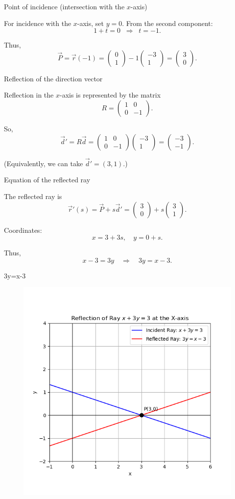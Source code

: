 \documentclass[journal]{IEEEtran}
\begin{document}
 Point of incidence (intersection with the $x$-axis)


For incidence with the $x$-axis, set $y=0$.  
From the second component:
\[
1+t=0 \;\;\Rightarrow\;\; t=-1.
\]

Thus,
\[
\vec{P}=\vec{r}(-1)
=\begin{pmatrix}0\\1\end{pmatrix} -1\begin{pmatrix}-3\\1\end{pmatrix}
=\begin{pmatrix}3\\0\end{pmatrix}.
\]


 Reflection of the direction vector


Reflection in the $x$-axis is represented by the matrix
\[
R=\begin{pmatrix}1 & 0\\[4pt] 0 & -1\end{pmatrix}.
\]

So,
\[
\vec{d}'=R\vec{d}
=\begin{pmatrix}1 & 0\\ 0 & -1\end{pmatrix}
\begin{pmatrix}-3\\1\end{pmatrix}
=\begin{pmatrix}-3\\-1\end{pmatrix}.
\]

(Equivalently, we can take $\vec{d}'=(3,1)$.)


 Equation of the reflected ray


The reflected ray is
\[
\vec{r}'(s)=\vec{P}+s\vec{d}'
=\begin{pmatrix}3\\0\end{pmatrix}+s\begin{pmatrix}3\\1\end{pmatrix}.
\]

Coordinates:
\[
x=3+3s, \quad y=0+s.
\]

Thus,
\[
x-3=3y \quad \Rightarrow \quad 3y=x-3.
\]

  \; 3y=x-3 
\begin{figure}[H]
\begin{center}
\includegraphics[width=0.6\columnwidth]{Figs/Fig1.png}
\end{center}
\caption{}
\label{fig:Fig.1}
\end{figure}
\end{document}
